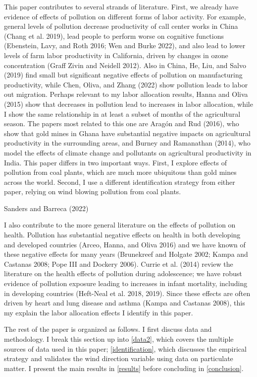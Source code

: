 \documentclass[
]{article}
\begin{document}
This paper contributes to several strands of literature. First, we already have evidence of effects of pollution on different forms of labor activity. For example, general levels of pollution decrease productivity of call center works in China (Chang et al. 2019), lead people to perform worse on cognitive functions (Ebenstein, Lavy, and Roth 2016; Wen and Burke 2022), and also lead to lower levels of farm labor productivity in California, driven by changes in ozone concentration (Graff Zivin and Neidell 2012). Also in China, He, Liu, and Salvo (2019) find small but significant negative effects of pollution on manufacturing productivity, while Chen, Oliva, and Zhang (2022) show pollution leads to labor out migration. Perhaps relevant to my labor allocation results, Hanna and Oliva (2015) show that decreases in pollution lead to increases in labor allocation, while I show the same relationship in at least a subset of months of the agricultural season. The papers most related to this one are Aragón and Rud (2016), who show that gold mines in Ghana have substantial negative impacts on agricultural productivity in the surrounding areas, and Burney and Ramanathan (2014), who model the effects of climate change and pollutants on agricultural productivity in India. This paper differs in two important ways. First, I explore effects of pollution from coal plants, which are much more ubiquitous than gold mines across the world. Second, I use a different identification strategy from either paper, relying on wind blowing pollution from coal plants.

Sanders and Barreca (2022)

I also contribute to the more general literature on the effects of pollution on health. Pollution has substantial negative effects on health in both developing and developed countries (Arceo, Hanna, and Oliva 2016) and we have known of these negative effects for many years (Brunekreef and Holgate 2002; Kampa and Castanas 2008; Pope III and Dockery 2006). Currie et al. (2014) review the literature on the health effects of pollution during adolescence; we have robust evidence of pollution exposure leading to increases in infant mortality, including in developing countries (Heft-Neal et al. 2018, 2019). Since these effects are often driven by heart and lung disease and asthma (Kampa and Castanas 2008), this my explain the labor allocation effects I identify in this paper.

The rest of the paper is organized as follows. I first discuss data and methodology. I break this section up into \autoref{data2}, which covers the multiple sources of data used in this paper; \autoref{identification}, which discusses the empirical strategy and validates the wind direction variable using data on particulate matter. I present the main results in \autoref{results} before concluding in \autoref{conclusion}.
\end{document}
